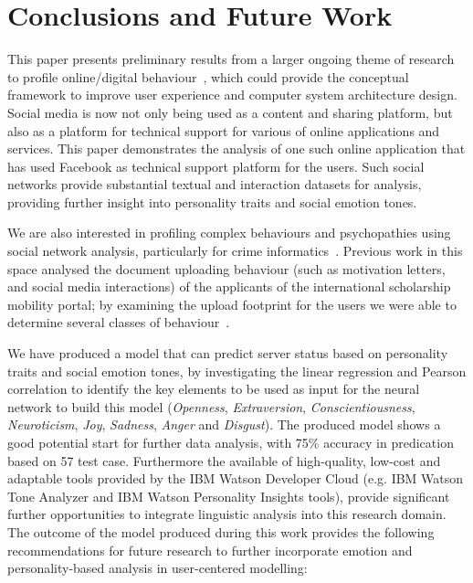 \documentclass[graybox]{svmult}
\begin{document}
{{{\section{Conclusions and Future Work}\label{conclusions}

This paper presents preliminary results from a larger ongoing theme of
research to profile online/digital
behaviour~\citep{oatley+crick:2014,oatley-et-al_dasc2015}, which could
provide the conceptual framework to improve user experience and
computer system architecture design. Social media is now not only
being used as a content and sharing platform, but also as a platform
for technical support for various of online applications and
services. This paper demonstrates the analysis of one such online
application that has used Facebook as technical support platform for
the users. Such social networks provide substantial textual and
interaction datasets for analysis, providing further insight into
personality traits and social emotion tones.

We are also interested in profiling complex behaviours and
psychopathies using social network analysis, particularly for crime
informatics~\cite{oatley+crick:2015}. Previous work in this space
analysed the document uploading behaviour (such as motivation letters,
and social media interactions) of the applicants of the international
scholarship mobility portal; by examining the upload footprint for the
users we were able to determine several classes of
behaviour~\citep{oatley-et-al-soccogcomp2015}.

We have produced a model that can predict server status based on
personality traits and social emotion tones, by investigating the
linear regression and Pearson correlation to identify the key elements
to be used as input for the neural network to build this model
({\emph{Openness}}, {\emph{Extraversion}}, {\emph{Conscientiousness}},
{\emph{Neuroticism}}, {\emph{Joy}}, {\emph{Sadness}}, {\emph{Anger}}
and {\emph{Disgust}}). The produced model shows a good potential start
for further data analysis, with 75\% accuracy in predication based on
57 test case. Furthermore the available of high-quality, low-cost and
adaptable tools provided by the IBM Watson Developer Cloud (e.g. IBM
Watson Tone Analyzer and IBM Watson Personality Insights tools),
provide significant further opportunities to integrate linguistic
analysis into this research domain. The outcome of the model produced
during this work provides the following recommendations for future
research to further incorporate emotion and personality-based analysis
in user-centered modelling:

}}}
\end{document}
